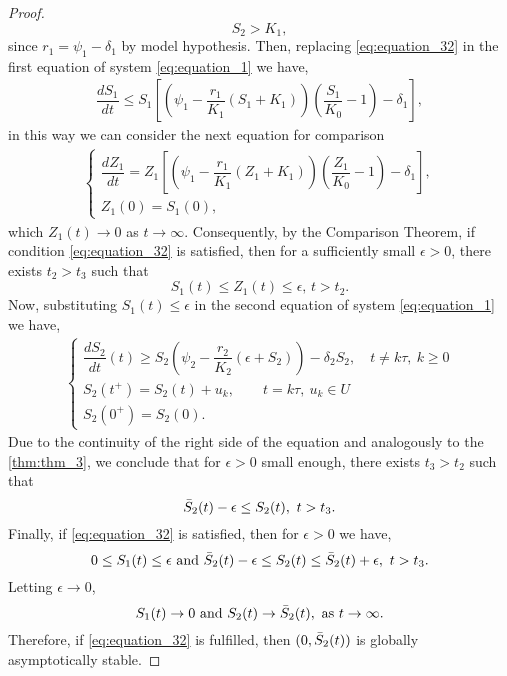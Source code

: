 \documentclass[10pt,letterpaper]{article}
\begin{document}
\begin{proof}
\begin{equation}
      S_2 > K_1,
\end{equation}since $r_1 = \psi_1 - \delta_1$ by model hypothesis.
Then, replacing \eqref{eq:equation_32} in the first equation of system \eqref{eq:equation_1} we have,
\begin{align}\label{eq:equation_33}
    \dfrac{dS_1}{dt} \leq S_1\left[\left(\psi_1 - \dfrac{r_1}{K_1}(S_1+K_1)\right)\left(\dfrac{S_1}{K_0} - 1\right) - \delta_1\right],
\end{align} in this way we can consider the next equation for comparison 
\begin{align}\label{eq:equation_34}
\begin{cases}
    \dfrac{dZ_1}{dt} = Z_1\left[\left(\psi_1 - \dfrac{r_1}{K_1}(Z_1+K_1)\right)\left(\dfrac{Z_1}{K_0} - 1\right) - \delta_1\right],\\
    Z_1(0) = S_1(0),
\end{cases}
\end{align}
which $Z_1(t) \to 0$ as $t \to \infty$. Consequently, by the Comparison Theorem, if condition \eqref{eq:equation_32} is satisfied, then for a sufficiently small $\epsilon>0$, there exists $t_2>t_3$ such that 
\begin{equation}\label{eq:equation_35}
    S_1(t) \leq Z_1(t) \leq \epsilon, \, t>t_2.
\end{equation}
Now, substituting $S_1(t) \leq \epsilon$ in the second equation of system \eqref{eq:equation_1} we have,
\begin{align}
\begin{cases}\label{eq:equation_36}
\dfrac{dS_2}{dt}(t)\geq S_2\left(\psi_2-\dfrac{r_2}{K_2}\left(\epsilon+S_2\right)\right)-\delta_2S_2,
\quad t \neq k\tau, \ k \geq 0  \\    
S_2(t^+)=S_2(t) + u_k,  \qquad t = k\tau, \ u_k \in U\\
S_2(0^+)=S_2(0).
\end{cases}
\end{align}
Due to the continuity of the right side of the equation and analogously to the \eqref{thm:thm_3}, we conclude that for $\epsilon>0$ small enough, there exists $t_3>t_2$ such that 
\begin{equation}\label{eq:equation_37}
    \Bar{S}_2(t)-\epsilon \leq S_2(t),\mbox{ } t>t_3.
\end{equation}
Finally, if \eqref{eq:equation_32} is satisfied, then for $\epsilon>0$ we have, 
\begin{equation}\label{eq:equation_38}
    0\leq S_1(t) \leq \epsilon \mbox{ and }  \Bar{S}_2(t)-\epsilon \leq S_2(t) \leq \Bar{S}_2(t)+\epsilon, \mbox{ } t>t_3. 
\end{equation}
Letting $\epsilon \to 0$,
\begin{equation}\label{eq:equation_39}
    S_1(t) \to 0 \mbox{ and } S_2(t) \to \Bar{S}_2(t), \mbox{ as } t \to \infty.
\end{equation}
Therefore, if \eqref{eq:equation_32} is fulfilled, then $(0, \Bar{S}_2(t))$ is globally asymptotically stable.
\end{proof}
\end{document}
